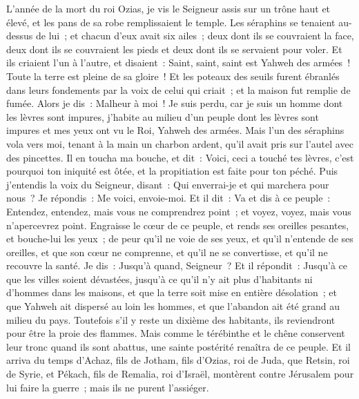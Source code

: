 \begin{multicols}{2}
\VerseOne{}L'année de la mort du roi Ozias, je vis le Seigneur assis sur un trône haut et élevé, et les pans de sa robe remplissaient le temple.
Les séraphins se tenaient au-dessus de lui~; et chacun d'eux avait six ailes~; deux dont ils se couvraient la face, deux dont ils se couvraient les pieds et deux dont ils se servaient pour voler.
Et ils criaient l'un à l'autre, et disaient~: Saint, saint, saint est Yahweh des armées~! Toute la terre est pleine de sa gloire~!
Et les poteaux des seuils furent ébranlés dans leurs fondements par la voix de celui qui criait~; et la maison fut remplie de fumée.
Alors je dis~: Malheur à moi~! Je suis perdu, car je suis un homme dont les lèvres sont impures, j'habite au milieu d'un peuple dont les lèvres sont impures et mes yeux ont vu le Roi, Yahweh des armées.
Mais l'un des séraphins vola vers moi, tenant à la main un charbon ardent, qu'il avait pris sur l'autel avec des pincettes.
Il en toucha ma bouche, et dit~: Voici, ceci a touché tes lèvres, c'est pourquoi ton iniquité est ôtée, et la propitiation est faite pour ton péché.
Puis j'entendis la voix du Seigneur, disant~: Qui enverrai-je et qui marchera pour nous~? Je répondis~: Me voici, envoie-moi.
Et il dit~: Va et dis à ce peuple~: Entendez, entendez, mais vous ne comprendrez point~; et voyez, voyez, mais vous n'apercevrez point.
Engraisse le cœur de ce peuple, et rends ses oreilles pesantes, et bouche-lui les yeux~; de peur qu'il ne voie de ses yeux, et qu'il n'entende de ses oreilles, et que son cœur ne comprenne, et qu'il ne se convertisse, et qu'il ne recouvre la santé.
Je dis~: Jusqu'à quand, Seigneur~? Et il répondit~: Jusqu'à ce que les villes soient dévastées, jusqu'à ce qu'il n'y ait plus d'habitants ni d'hommes dans les maisons, et que la terre soit mise en entière désolation~;
 et que Yahweh ait dispersé au loin les hommes, et que l'abandon ait été grand au milieu du pays.
Toutefois s'il y reste un dixième des habitants, ils reviendront pour être la proie des flammes. Mais comme le térébinthe et le chêne conservent leur tronc quand ils sont abattus, une sainte postérité renaîtra de ce peuple.
\VerseOne{}Et il arriva du temps d'Achaz, fils de Jotham, fils d'Ozias, roi de Juda, que Retsin, roi de Syrie, et Pékach, fils de Remalia, roi d'Israël, montèrent contre Jérusalem pour lui faire la guerre~; mais ils ne purent l'assiéger.

\end{multicols}
